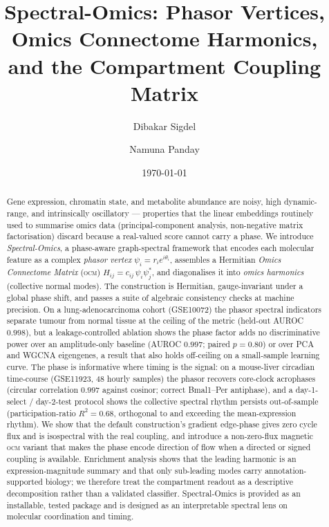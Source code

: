\documentclass[preprint,12pt,amsmath,amssymb,superscriptaddress,floatfix]{revtex4-2}
\theoremstyle{definition}
\theoremstyle{plain}
\newcommand{\OCM}{\textsc{ocm}}
\begin{document}
\title{Spectral-Omics: Phasor Vertices, Omics Connectome Harmonics,\\
       and the Compartment Coupling Matrix}

\author{Dibakar Sigdel}
\author{Namuna Panday}

\date{\today}

\begin{abstract}
Gene expression, chromatin state, and metabolite abundance are noisy, high
dynamic-range, and intrinsically oscillatory --- properties that the linear
embeddings routinely used to summarise omics data (principal-component
analysis, non-negative matrix factorisation) discard because a real-valued
score cannot carry a phase. We introduce \emph{Spectral-Omics}, a phase-aware
graph-spectral framework that encodes each molecular feature as a complex
\emph{phasor vertex} $\psi_i = r_i e^{i\theta_i}$, assembles a Hermitian
\emph{Omics Connectome Matrix} (\OCM) $H_{ij} = c_{ij}\,\psi_i\psi_j^{*}$, and
diagonalises it into \emph{omics harmonics} (collective normal modes). The
construction is Hermitian, gauge-invariant under a global phase shift, and passes
a suite of algebraic consistency checks at machine precision. On a
lung-adenocarcinoma cohort (GSE10072) the phasor spectral indicators separate
tumour from normal tissue at the ceiling of the metric (held-out AUROC $0.998$),
but a leakage-controlled ablation shows the phase factor adds no
discriminative power over an amplitude-only baseline (AUROC $0.997$; paired
$p=0.80$) or over PCA and WGCNA eigengenes, a result that also holds off-ceiling
on a small-sample learning curve. The phase is informative where
timing is the signal: on a mouse-liver circadian time-course (GSE11923, 48 hourly
samples) the phasor recovers core-clock acrophases (circular correlation $0.997$
against cosinor; correct Bmal1--Per antiphase), and a day-1-select /
day-2-test protocol shows the collective spectral rhythm persists
out-of-sample (participation-ratio $R^2=0.68$, orthogonal to and exceeding the
mean-expression rhythm). We show that the default construction's
gradient edge-phase gives zero cycle flux and is isospectral with the real
coupling, and introduce a non-zero-flux
magnetic \OCM{} variant that makes the phase encode direction of flow when a
directed or signed coupling is available. Enrichment analysis shows that the
leading harmonic is an expression-magnitude summary and that only sub-leading
modes carry annotation-supported biology; we therefore treat the compartment
readout as a descriptive decomposition rather than a validated classifier.
Spectral-Omics is provided as an installable, tested package and is designed as
an interpretable spectral lens on molecular coordination and timing.
\end{abstract}
\end{document}

